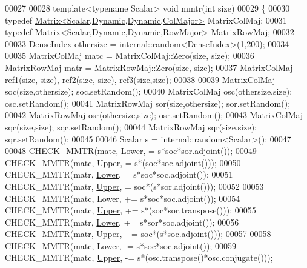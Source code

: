 \begin{DoxyCode}
00027 
00028 \textcolor{keyword}{template}<\textcolor{keyword}{typename} Scalar> \textcolor{keywordtype}{void} mmtr(\textcolor{keywordtype}{int} size)
00029 \{
00030   \textcolor{keyword}{typedef} \hyperlink{group___core___module_class_eigen_1_1_matrix}{Matrix<Scalar,Dynamic,Dynamic,ColMajor>} MatrixColMaj;
00031   \textcolor{keyword}{typedef} \hyperlink{group___core___module_class_eigen_1_1_matrix}{Matrix<Scalar,Dynamic,Dynamic,RowMajor>} MatrixRowMaj;
00032 
00033   DenseIndex othersize = internal::random<DenseIndex>(1,200);
00034   
00035   MatrixColMaj matc = MatrixColMaj::Zero(size, size);
00036   MatrixRowMaj matr = MatrixRowMaj::Zero(size, size);
00037   MatrixColMaj ref1(size, size), ref2(size, size), ref3(size,size);
00038   
00039   MatrixColMaj soc(size,othersize); soc.setRandom();
00040   MatrixColMaj osc(othersize,size); osc.setRandom();
00041   MatrixRowMaj sor(size,othersize); sor.setRandom();
00042   MatrixRowMaj osr(othersize,size); osr.setRandom();
00043   MatrixColMaj sqc(size,size); sqc.setRandom();
00044   MatrixRowMaj sqr(size,size); sqr.setRandom();
00045   
00046   Scalar s = internal::random<Scalar>();
00047   
00048   CHECK\_MMTR(matc, \hyperlink{group__enums_gga39e3366ff5554d731e7dc8bb642f83cda891792b8ed394f7607ab16dd716f60e6}{Lower}, = s*soc*sor.adjoint());
00049   CHECK\_MMTR(matc, \hyperlink{group__enums_gga39e3366ff5554d731e7dc8bb642f83cda6bcb58be3b8b8ec84859ce0c5ac0aaec}{Upper}, = s*(soc*soc.adjoint()));
00050   CHECK\_MMTR(matr, \hyperlink{group__enums_gga39e3366ff5554d731e7dc8bb642f83cda891792b8ed394f7607ab16dd716f60e6}{Lower}, = s*soc*soc.adjoint());
00051   CHECK\_MMTR(matr, \hyperlink{group__enums_gga39e3366ff5554d731e7dc8bb642f83cda6bcb58be3b8b8ec84859ce0c5ac0aaec}{Upper}, = soc*(s*sor.adjoint()));
00052   
00053   CHECK\_MMTR(matc, \hyperlink{group__enums_gga39e3366ff5554d731e7dc8bb642f83cda891792b8ed394f7607ab16dd716f60e6}{Lower}, += s*soc*soc.adjoint());
00054   CHECK\_MMTR(matc, \hyperlink{group__enums_gga39e3366ff5554d731e7dc8bb642f83cda6bcb58be3b8b8ec84859ce0c5ac0aaec}{Upper}, += s*(soc*sor.transpose()));
00055   CHECK\_MMTR(matr, \hyperlink{group__enums_gga39e3366ff5554d731e7dc8bb642f83cda891792b8ed394f7607ab16dd716f60e6}{Lower}, += s*sor*soc.adjoint());
00056   CHECK\_MMTR(matr, \hyperlink{group__enums_gga39e3366ff5554d731e7dc8bb642f83cda6bcb58be3b8b8ec84859ce0c5ac0aaec}{Upper}, += soc*(s*soc.adjoint()));
00057   
00058   CHECK\_MMTR(matc, \hyperlink{group__enums_gga39e3366ff5554d731e7dc8bb642f83cda891792b8ed394f7607ab16dd716f60e6}{Lower}, -= s*soc*soc.adjoint());
00059   CHECK\_MMTR(matc, \hyperlink{group__enums_gga39e3366ff5554d731e7dc8bb642f83cda6bcb58be3b8b8ec84859ce0c5ac0aaec}{Upper}, -= s*(osc.transpose()*osc.conjugate()));

\end{DoxyCode}
